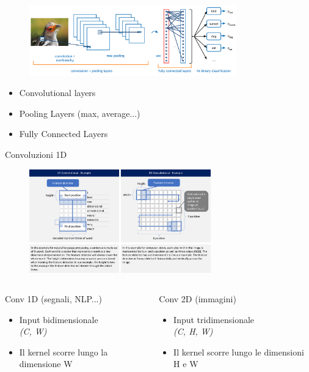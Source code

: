 \documentclass[xcolor=x11names,compress, 
]{beamer}
\theoremstyle{definition} \newtheorem{esempio}{Esempio}
\theoremstyle{definition}
\begin{document}
		\begin{frame}{\subsecname}
			\begin{figure}
				\includegraphics[width=0.8\textwidth]{immagini/cnnlayer}
			\end{figure}
			\begin{itemize}
				\item Convolutional layers
				\item Pooling Layers (max, average...)
				\item Fully Connected Layers
			\end{itemize}
		\end{frame}
		\begin{frame}{Convoluzioni 1D}
			\begin{figure}
				\includegraphics[width=0.7\textwidth]{immagini/conv1d}
			\end{figure}
			\begin{columns}
				\begin{column}{0.5\textwidth}
					Conv 1D (segnali, NLP...)
					\begin{itemize}
						\item Input bidimensionale\\\textit{(C, W)}
						\item Il kernel scorre lungo la dimensione W
					\end{itemize}
				\end{column}
				\begin{column}{0.5\textwidth}
					Conv 2D (immagini)
					\begin{itemize}
						\item Input tridimensionale\\\textit{(C, H, W)}
						\item Il kernel scorre lungo le dimensioni H e W
					\end{itemize}
				\end{column}
			\end{columns}
		\end{frame}
\end{document}
